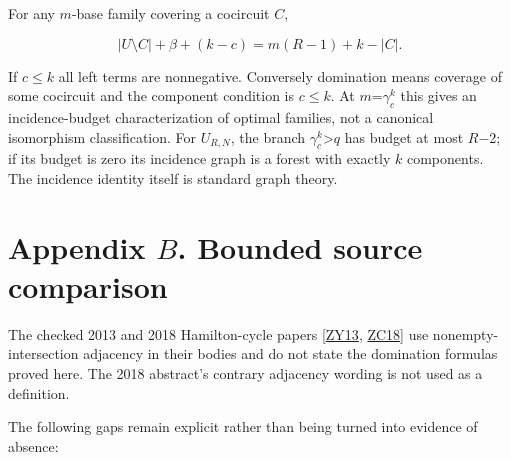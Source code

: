 \documentclass[11pt]{article}
\begin{document}
For any \(m\)-base family covering a cocircuit \(C\),

\[
|U\setminus C|+\beta+(k-c)=m(R-1)+k-|C|.
\]

If \(c\le k\) all left terms are nonnegative. Conversely domination means coverage of some cocircuit and the component condition is \(c\le k\). At \(m\)=\(\gamma_c^k\) this gives an incidence-budget characterization of optimal families, not a canonical isomorphism classification. For \(U_{R,N}\), the branch \(\gamma_c^k\)>\(q\) has budget at most \(R\)\ensuremath{-}2; if its budget is zero its incidence graph is a forest with exactly \(k\) components. The incidence identity itself is standard graph theory.

\section*{Appendix \(B\). Bounded source comparison}

The checked 2013 and 2018 Hamilton-cycle papers [\hyperlink{refZY13}{ZY13}, \hyperlink{refZC18}{ZC18}] use nonempty-intersection adjacency in their bodies and do not state the domination formulas proved here. The 2018 abstract's contrary adjacency wording is not used as a definition.

The following gaps remain explicit rather than being turned into evidence of absence:
\end{document}
